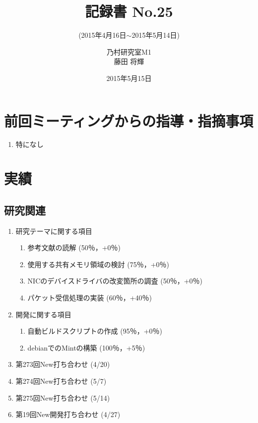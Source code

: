 \documentclass[fleqn, 14pt]{extarticle}
\subtitle{(2015年4月16日$\sim$2015年5月14日)}
\author{乃村研究室M1\\藤田 将輝}
\date{2015年5月15日}
\title{記録書 No.25}
\begin{document}
\maketitle
\section{前回ミーティングからの指導・指摘事項}
\label{sec-1}
\begin{enumerate}
\item 特になし
\newline
\hfill

\end{enumerate}

\section{実績}
\label{sec-2}

\subsection{研究関連}
\label{sec-2-1}
\begin{enumerate}
    \item 研究テーマに関する項目
    \hfill
    \label{enum-research1}
    \begin{enumerate}

        \item 参考文献の読解
        \hfill
        \label{enum-1-A}
        (50％，+0％)
        \item 使用する共有メモリ領域の検討
        \hfill
        \label{enum-1-B}
        (75％，+0％)
        \item NICのデバイスドライバの改変箇所の調査
        \hfill
        \label{enum-1-C}
        (50％，+0％)
        \item パケット受信処理の実装
        \hfill
        \label{enum-1-D}
        (60％，+40％)

    \end{enumerate}
    \item 開発に関する項目
    \hfill
    \label{enum-research2}
    \begin{enumerate}

        \item 自動ビルドスクリプトの作成
        \hfill
        \label{enum-2-A}
        (95％，+0％)
        \item debianでのMintの構築
        \hfill
        \label{enum-2-A}
        (100％，+5％)
    \end{enumerate}

    \item 第273回New打ち合わせ 
    \hfill
    \label{enum-research3}
    (4/20)
    \item 第274回New打ち合わせ 
    \hfill
    \label{enum-research3}
    (5/7)
    \item 第275回New打ち合わせ 
    \hfill
    \label{enum-research3}
    (5/14)
    \item 第19回New開発打ち合わせ
    \hfill
    \label{enum-research3}
    (4/27)
    \end{enumerate}
\end{document}
